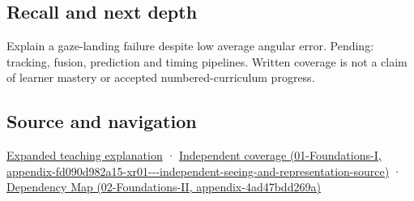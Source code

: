 \subsection{Recall and next depth}\label{appendix-a6f2c4fe1996-recall-and-next-depth}

Explain a gaze-landing failure despite low average angular error. Pending: tracking, fusion, prediction and timing pipelines. Written coverage is not a claim of learner mastery or accepted numbered-curriculum progress.

\subsection{Source and navigation}\label{appendix-a6f2c4fe1996-source-and-navigation}

\href{Continuous\%20Notes/University\%20-\%20Worlds,\%20Images\%20and\%20Inference\%20-\%20Graphics,\%20Vision\%20and\%20Photography\#A\%20gaze\%20sample\%20needs\%20a\%20time\%20as\%20well\%20as\%20a\%20direction}{Expanded teaching explanation} · \href{../01-Foundations-I/main.pdf\#nameddest=appendix-fd090d982a15-xr01---independent-seeing-and-representation-source}{Independent coverage (01-Foundations-I, appendix-fd090d982a15-xr01-\/-\/-independent-seeing-and-representation-source)} · \href{../02-Foundations-II/main.pdf\#nameddest=appendix-4ad47bdd269a}{Dependency Map (02-Foundations-II, appendix-4ad47bdd269a)}

